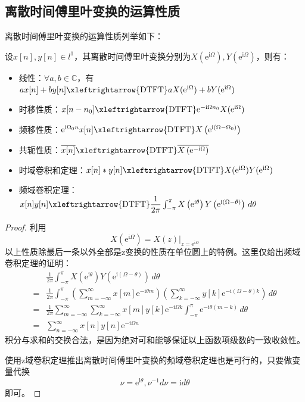 \subsection{离散时间傅里叶变换的运算性质}\label{sub:property_of_dtft}

离散时间傅里叶变换的运算性质列举如下：
\begin{proposition}[离散时间傅里叶变换的运算性质]
    设$x[n],y[n]\in l^1$，其离散时间傅里叶变换分别为$X(\mathrm{e}^{\mathrm{i}\Omega}),Y(\mathrm{e}^{\mathrm{i}\Omega})$，则有：\begin{itemize}
        \item  线性：$\forall a,b\in\mathbb{C}$，有$a x[n]+b y[n]\xleftrightarrow{\text{DTFT}} a X(\mathrm{e}^{\mathrm{i}\Omega})+b Y(\mathrm{e}^{\mathrm{i}\Omega})$
        \item 时移性质：$x[n-n_0]\xleftrightarrow{\text{DTFT}}\mathrm{e}^{-\mathrm{i}\Omega n_0}X(\mathrm{e}^{\mathrm{i}\Omega})$
        \item 频移性质：$\mathrm{e}^{\mathrm{i}\Omega_0 n}x[n]\xleftrightarrow{\text{DTFT}}X\left(\mathrm{e}^{\mathrm{i}(\Omega-\Omega_0)}\right)$
        \item 共轭性质：$\overline{x[n]}\xleftrightarrow{\text{DTFT}}\overline{X\left(\mathrm{e}^{-\mathrm{i}\Omega}\right)}$
        \item 时域卷积和定理：$x[n]*y[n]\xleftrightarrow{\text{DTFT}}X(\mathrm{e}^{\mathrm{i}\Omega})Y(\mathrm{e}^{\mathrm{i}\Omega})$
        \item 频域卷积定理：$x[n]y[n]\xleftrightarrow{\text{DTFT}}\dfrac{1}{2\pi}\int_{-\pi}^{\pi}X\left(\mathrm{e}^{\mathrm{i}\theta}\right)Y\left(\mathrm{e}^{\mathrm{i}(\Omega-\theta)}\right)\,d\theta$
    \end{itemize}
\end{proposition}
\begin{proof}
    利用\[X(\mathrm{e}^{\mathrm{i}\Omega})=X(z)|_{z=\mathrm{e}^{\mathrm{i}\Omega}}\]
    以上性质除最后一条以外全部是z变换的性质在单位圆上的特例。这里仅给出频域卷积定理的证明：
    \begin{align*}
        &\frac{1}{2\pi}\int_{-\pi}^{\pi}X\left(\mathrm{e}^{\mathrm{i}\theta}\right)Y\left(\mathrm{e}^{\mathrm{i}(\Omega-\theta)}\right)\,d\theta\\
        =&\frac{1}{2\pi}\int_{-\pi}^{\pi}\left(\sum_{m=-\infty}^{\infty}x[m]\mathrm{e}^{-\mathrm{i}\theta m}\right)\left(\sum_{k=-\infty}^{\infty}y[k]\mathrm{e}^{-\mathrm{i}(\Omega-\theta) k}\right)\,d\theta\\
        =&\frac{1}{2\pi}\sum_{m=-\infty}^{\infty}\sum_{k=-\infty}^{\infty}x[m]y[k]\mathrm{e}^{-\mathrm{i}\Omega k}\int_{-\pi}^{\pi}\mathrm{e}^{-\mathrm{i}\theta (m-k)}\,d\theta\\
        =&\sum_{n=-\infty}^{\infty}x[n]y[n]\mathrm{e}^{-\mathrm{i}\Omega n}
    \end{align*}
    积分与求和的交换合法，是因为绝对可和能够保证以上函数项级数的一致收敛性。

    使用z域卷积定理推出离散时间傅里叶变换的频域卷积定理也是可行的，只要做变量代换
    $$\nu=\mathrm{e}^{\mathrm{i}\theta},\nu^{-1}d\nu=\mathrm{i}d\theta$$
    即可。
\end{proof}

